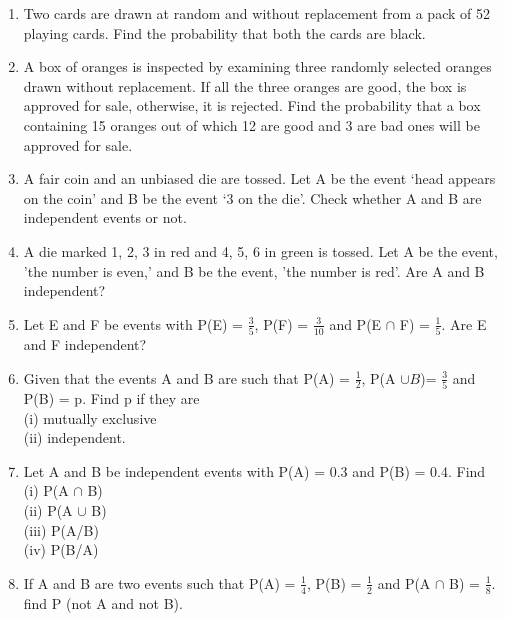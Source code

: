 \begin{enumerate}[label=\arabic*.,ref=\thesubsection.\theenumi]
\item Two cards are drawn at random and without replacement from a pack of 52 playing cards. Find the probability that both the cards are black.\\

\item A box of oranges is inspected by examining three randomly selected oranges drawn without replacement. If all the three oranges are good, the box is approved for sale, otherwise, it is rejected. Find the probability that a box containing 15 oranges out of which 12 are good and 3 are bad ones will be approved for sale.\\

\item A fair coin and an unbiased die are tossed. Let A be the event ‘head appears on
the coin’ and B be the event ‘3 on the die’. Check whether A and B are independent events or not.\\

\item A die marked 1, 2, 3 in red and 4, 5, 6 in green is tossed. Let A be the event, 'the number is even,' and B be the event, 'the number is red'. Are A and B
independent?\\

\item Let E and F be events with P(E) = $\frac{3}{5}$, P(F) = $\frac{3}{10}$ and  P(E $\cap$ F) = $\frac{1}{5}$. Are E and F independent?\\

\item Given that the events A and B are such that P(A) = $\frac{1}{2}$, P(A $\cup B$)= $\frac{3}{5}$ and P(B) = p. Find p if they are\\
(i) mutually exclusive\\
(ii) independent.\\

\item Let A and B be independent events with P(A) = 0.3 and P(B) = 0.4. Find\\
(i) P(A $\cap$ B)\\ 
(ii) P(A $\cup$ B)\\
(iii) P(A/B)\\
(iv) P(B/A)\\

\item If A and B are two events such that P(A) = $\frac{1}{4}$, P(B) = $\frac{1}{2}$ and P(A $\cap$ B) = $\frac{1}{8}$. find P (not A and not B).\\


\end{enumerate}
